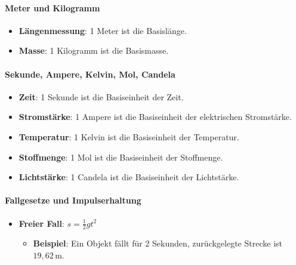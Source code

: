 \documentclass{vorlage-design-main}
\begin{document}
\hypertarget{meter-und-kilogramm}{%
\paragraph{Meter und Kilogramm}\label{meter-und-kilogramm}}

\begin{itemize}

\item
  \textbf{Längenmessung}: 1 Meter ist die Basislänge.
\item
  \textbf{Masse}: 1 Kilogramm ist die Basismasse.
\end{itemize}

\hypertarget{sekunde-ampere-kelvin-mol-candela}{%
\paragraph{Sekunde, Ampere, Kelvin, Mol,
Candela}\label{sekunde-ampere-kelvin-mol-candela}}

\begin{itemize}

\item
  \textbf{Zeit}: 1 Sekunde ist die Basiseinheit der Zeit.
\item
  \textbf{Stromstärke}: 1 Ampere ist die Basiseinheit der elektrischen
  Stromstärke.
\item
  \textbf{Temperatur}: 1 Kelvin ist die Basiseinheit der Temperatur.
\item
  \textbf{Stoffmenge}: 1 Mol ist die Basiseinheit der Stoffmenge.
\item
  \textbf{Lichtstärke}: 1 Candela ist die Basiseinheit der Lichtstärke.
\end{itemize}

\hypertarget{fallgesetze-und-impulserhaltung}{%
\paragraph{Fallgesetze und
Impulserhaltung}\label{fallgesetze-und-impulserhaltung}}

\begin{itemize}

\item
  \textbf{Freier Fall}: $s = \frac{1}{2} g t^2$

  \begin{itemize}
  
  \item
    \textbf{Beispiel}: Ein Objekt fällt für 2 Sekunden, zurückgelegte
    Strecke ist $19,62 \, \text{m}$.
  \end{itemize}
\end{itemize}
\end{document}
